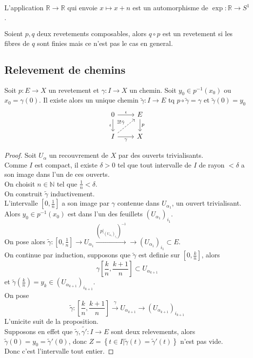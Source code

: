 \documentclass[../main.tex]{subfiles}
\begin{document}
\begin{exemple}
L'application $\mathbb{R}\to \mathbb{R}$ qui envoie $x\mapsto x+n$ est un automorphisme de $\exp : \mathbb{R} \to S^{1}$.
\end{exemple}
\begin{rmq}
Soient $p,q$ deux revetements composables, alors $q\circ p$ est un revetement si les fibres de $q$ sont finies mais ce n'est pas le cas en general.
\end{rmq}
\subsection{Relevement de chemins}
\begin{thm}
	Soit $p:E\to X$ un revetement et $\gamma:I\to X$ un chemin. Soit $y_0 \in p^{-1}( x_0) $ ou $x_0= \gamma( 0) $. Il existe alors un unique chemin $\tilde \gamma: I \to E$ tq $p\circ\tilde \gamma = \gamma$ et $\tilde\gamma( 0) = y_0$ 
\[\begin{tikzcd}
	0 & E \\
	I & X
	\arrow["\iota", from=1-1, to=1-2]
	\arrow["\iota"', from=1-1, to=2-1]
	\arrow["p", from=1-2, to=2-2]
	\arrow["\gamma"', from=2-1, to=2-2]
	\arrow["{\exists! \tilde\gamma}", dashed, from=2-1, to=1-2]
\end{tikzcd}\]
\end{thm}
\begin{proof}
Soit $U_\alpha$ un recouvrement de $X$ par des ouverts trivialisants.\\
Comme $I$ est compact, il existe $\delta>0$ tel que tout intervalle de $I$ de rayon $< \delta$ a son image dans l'un de ces ouverts.\\
On choisit $n \in \mathbb{N}$ tel que $\frac{1}{n}< \delta$.\\
On construit $\tilde\gamma$ inductivement.\\
L'intervalle $[0,\frac{1}{n}]$ a son image par $\gamma$ contenue dans $U_{\alpha_1} $, un ouvert trivialisant.\\
Alors $y_0 \in p^{-1}( x_0) $ est dans l'un des feuillets $( U_{\alpha_1})_{i_1} $.\\
On pose alors $\tilde\gamma : [ 0,\frac{1}{n}] \to U_{\alpha_1} \xrightarrow{ ( p|_{( U_{\alpha_1} )_{i_1}  } )^{-1}} \to ( U_{\alpha_1} )_{i_1} \subset E   $.\\
On continue par induction, supposons que $\tilde\gamma$ est definie sur $ [ 0, \frac{k}{n}] $, alors 
\[ 
\gamma [ \frac{k}{n}, \frac{k+1}{n}] \subset  U_{\alpha_{k+1} } 
\]
et $\tilde\gamma( \frac{k}{n}) = y_k \in ( U_{\alpha_{k+1} } )_{i_{k+1} }  $.\\
On pose
\[ 
	\tilde\gamma: [ \frac{k}{n}, \frac{k+1}{n}]\xrightarrow{\gamma} U_{\alpha_{k+1} }   \to(  U_{\alpha_{k+1} } ) _{i_{k+1} }	
\]
L'unicite suit de la proposition.\\
Supposons en effet que $\tilde\gamma, \tilde{\gamma'}: I\to E$ sont deux relevements, alors $\tilde\gamma( 0) = y_0= \tilde\gamma'( 0) $, donc $Z= \left\{ t\in I | \tilde\gamma( t) = \tilde\gamma'( t)  \right\} $ n'est pas vide.\\
Donc c'est l'intervalle tout entier.
\end{proof}
\end{document}
